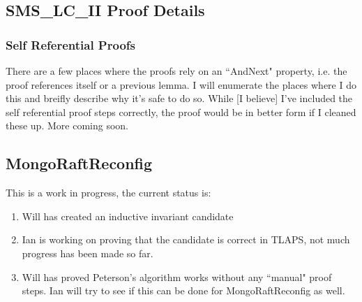 \documentclass[12pt]{article}
\begin{document}
\subsection{SMS\_LC\_II Proof Details}
\subsubsection{Self Referential Proofs}
There are a few places where the proofs rely on an ``AndNext" property, i.e. the proof references itself or a previous lemma.  I will enumerate the places where I do this and breifly describe why it's safe to do so.  While [I believe] I've included the self referential proof steps correctly, the proof would be in better form if I cleaned these up.  More coming soon.  

\subsection{MongoRaftReconfig}
This is a work in progress, the current status is:
\begin{enumerate}
	\item Will has created an inductive invariant candidate
	\item Ian is working on proving that the candidate is correct in TLAPS, not much progress has been made so far.  
	\item Will has proved Peterson's algorithm works without any ``manual" proof steps.  Ian will try to see if this can be done for MongoRaftReconfig as well.  
\end{enumerate}
\end{document}
